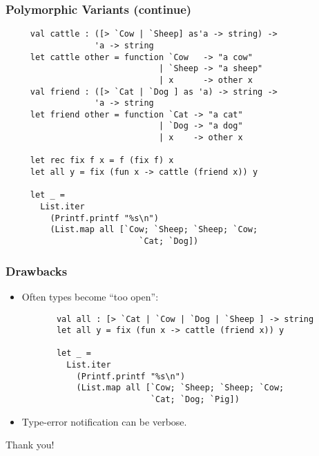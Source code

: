 \documentclass{beamer}
\begin{document}
\begin{frame}[fragile]
  \frametitle{Polymorphic Variants (continue)}
  \begin{lstlisting}
     val cattle : ([> `Cow | `Sheep] as'a -> string) -> 
                  'a -> string
     let cattle other = function `Cow   -> "a cow" 
                               | `Sheep -> "a sheep"
                               | x      -> other x 
     val friend : ([> `Cat | `Dog ] as 'a) -> string -> 
                  'a -> string
     let friend other = function `Cat -> "a cat" 
                               | `Dog -> "a dog"
                               | x    -> other x

     let rec fix f x = f (fix f) x
     let all y = fix (fun x -> cattle (friend x)) y 

     let _ = 
       List.iter 
         (Printf.printf "%s\n") 
         (List.map all [`Cow; `Sheep; `Sheep; `Cow; 
                           `Cat; `Dog])
  \end{lstlisting}  
\end{frame}

\begin{frame}[fragile]
  \frametitle{Drawbacks}
  
  \begin{itemize}
     \item Often types become ``too open'':
     \begin{lstlisting}
       val all : [> `Cat | `Cow | `Dog | `Sheep ] -> string
       let all y = fix (fun x -> cattle (friend x)) y 

       let _ = 
         List.iter 
           (Printf.printf "%s\n") 
           (List.map all [`Cow; `Sheep; `Sheep; `Cow; 
                          `Cat; `Dog; `Pig])
     \end{lstlisting}
     \item Type-error notification can be verbose.
  \end{itemize}
\end{frame}

\begin{frame}
  \begin{center}
  {\Large Thank you!}
  \end{center}
\end{frame}
\end{document}
